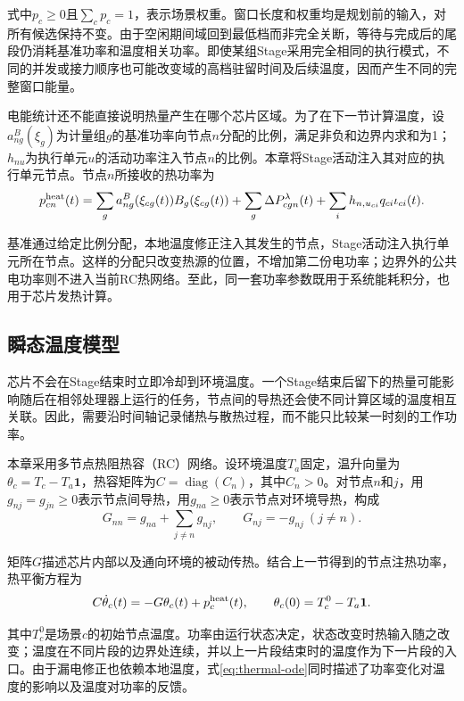 式中$p_c\ge0$且$\sum_cp_c=1$，表示场景权重。窗口长度和权重均是规划前的输入，对所有候选保持不变。由于空闲期间域回到最低档而非完全关断，等待与完成后的尾段仍消耗基准功率和温度相关功率。即使某组Stage采用完全相同的执行模式，不同的并发或接力顺序也可能改变域的高档驻留时间及后续温度，因而产生不同的完整窗口能量。

电能统计还不能直接说明热量产生在哪个芯片区域。为了在下一节计算温度，设$a^B_{ng}(\xi_g)$为计量组$g$的基准功率向节点$n$分配的比例，满足非负和边界内求和为1；$h_{nu}$为执行单元$u$的活动功率注入节点$n$的比例。本章将Stage活动注入其对应的执行单元节点。节点$n$所接收的热功率为
\begin{equation}
p^{\rm heat}_{cn}(t)=
\sum_g a^B_{ng}(\xi_{cg}(t))B_g(\xi_{cg}(t))
+\sum_g\Delta P^\lambda_{cgn}(t)
+\sum_i h_{n,u_{ci}}q_{ci}\iota_{ci}(t).
\label{eq:local-heat-input}
\end{equation}

基准通过给定比例分配，本地温度修正注入其发生的节点，Stage活动注入执行单元所在节点。这样的分配只改变热源的位置，不增加第二份电功率；边界外的公共电功率则不进入当前RC热网络。至此，同一套功率参数既用于系统能耗积分，也用于芯片发热计算。

\subsection{瞬态温度模型}

芯片不会在Stage结束时立即冷却到环境温度。一个Stage结束后留下的热量可能影响随后在相邻处理器上运行的任务，节点间的导热还会使不同计算区域的温度相互关联。因此，需要沿时间轴记录储热与散热过程，而不能只比较某一时刻的工作功率。

本章采用多节点热阻热容（RC）网络\cite{chantem2011,fdtm2022}。设环境温度$T_a$固定，温升向量为$\theta_c=T_c-T_a\mathbf1$，热容矩阵为$C=\operatorname{diag}(C_n)$，其中$C_n>0$。对节点$n$和$j$，用$g_{nj}=g_{jn}\ge0$表示节点间导热，用$g_{na}\ge0$表示节点对环境导热，构成
\begin{equation}
G_{nn}=g_{na}+\sum_{j\ne n}g_{nj},\qquad
G_{nj}=-g_{nj}\ (j\ne n).
\label{eq:conductance-matrix}
\end{equation}

矩阵$G$描述芯片内部以及通向环境的被动传热。结合上一节得到的节点注热功率，热平衡方程为
\begin{equation}
C\dot\theta_c(t)=-G\theta_c(t)+p^{\rm heat}_c(t),\qquad
\theta_c(0)=T_c^0-T_a\mathbf1.
\label{eq:thermal-ode}
\end{equation}

其中$T_c^0$是场景$c$的初始节点温度。功率由运行状态决定，状态改变时热输入随之改变；温度在不同片段的边界处连续，并以上一片段结束时的温度作为下一片段的入口。由于漏电修正也依赖本地温度，式\eqref{eq:thermal-ode}同时描述了功率变化对温度的影响以及温度对功率的反馈。

